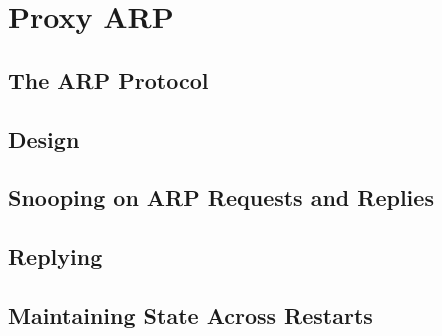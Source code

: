 \chapter{Proxy ARP}

\section{The ARP Protocol}
 \label{proxy_arp:protocol}

\section{Design}

\section{Snooping on ARP Requests and Replies}

\section{Replying}

\section{Maintaining State Across Restarts}

